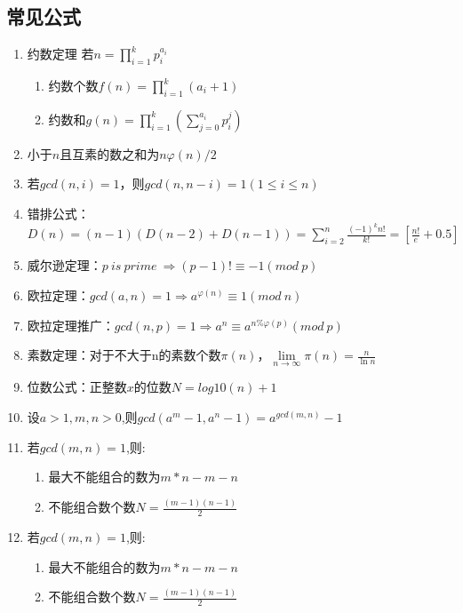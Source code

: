 \documentclass[a4paper,13.6pt]{article}
\begin{document}
\begin{CJK}{UTF8}{gbsn}
\subsection{常见公式}
\begin{enumerate}
\item 约数定理 若$n=\prod_{i=1}^kp_i^{a_i}$

\begin{enumerate}
\item 约数个数$f(n)=\prod_{i=1}^k(a_i+1)$
\item 约数和$g(n)=\prod_{i=1}^k(\sum_{j=0}^{a_i}p_i^j)$
\end{enumerate}

\item 小于$n$且互素的数之和为$n\varphi(n)/2$

\item 若$gcd(n,i)=1$，则$gcd(n,n-i)=1(1\leq i\leq n)$

\item 错排公式：$D(n)=(n-1)(D(n-2)+D(n-1))=\sum_{i=2}^n\frac{(-1)^kn!}{k!}=[\frac{n!}{e}+0.5]$

\item 威尔逊定理：$p\ is\ prime\ \Rightarrow (p-1)!\equiv-1(mod\ p)$

\item 欧拉定理：$gcd(a,n)=1\Rightarrow a^{\varphi(n)}\equiv1(mod\ n)$

\item 欧拉定理推广：$gcd(n,p)=1\Rightarrow a^n\equiv a^{n\%\varphi(p)}(mod\ p)$

\item 素数定理：对于不大于n的素数个数$\pi(n)$，$\lim\limits_{n\to\infty}\pi(n)=\frac{n}{\ln n}$

\item 位数公式：正整数$x$的位数$N=log10(n)+1$

\item 设$a>1,m,n>0$,则$gcd(a^m-1,a^n-1)=a^{gcd(m,n)}-1$

\item 若$gcd(m,n)=1$,则:

\begin{enumerate}
\item 最大不能组合的数为$m*n-m-n$
\item 不能组合数个数$N=\frac{(m-1)(n-1)}{2}$
\end{enumerate}
\item 若$gcd(m,n)=1$,则:

\begin{enumerate}
\item 最大不能组合的数为$m*n-m-n$
\item 不能组合数个数$N=\frac{(m-1)(n-1)}{2}$
\end{enumerate}


\end{enumerate}
\end{CJK}
\end{document}
